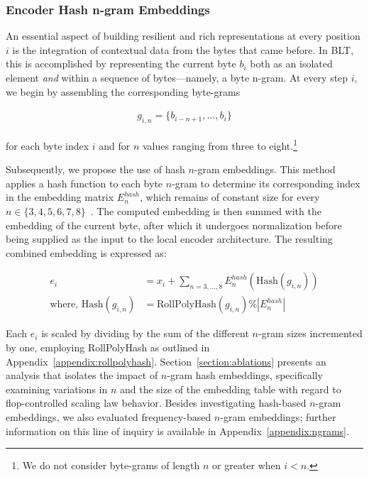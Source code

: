 \subsubsection{Encoder Hash n-gram Embeddings}
\label{sec:ngram-emb}
\label{sec:hash-emb}
An essential aspect of building resilient and rich representations at every position $i$ is the integration of contextual data from the bytes that came before. In {\textsc BLT}, this is accomplished by representing the current byte $b_i$ both as an isolated element \textit{and} within a sequence of bytes—namely, a byte n-gram. At every step $i$, we begin by assembling the corresponding byte-grams

\begin{align}
    g_{i,n}=\{b_{i-n + 1},\ldots, b_i\}
\end{align}

for each byte index $i$ and for $n$ values ranging from three to eight.\footnote{
We do not consider byte-grams of length $n$ or greater when $i<n$. }

Subsequently, we propose the use of hash $n$-gram embeddings. This method applies a hash function to each byte $n$-gram to determine its corresponding index in the embedding matrix $E_{n}^{hash}$, which remains of constant size for every $n \in\{3,4,5,6,7,8\}$~\citep{bai2010learning}. The computed embedding is then summed with the embedding of the current byte, after which it undergoes normalization before being supplied as the input to the local encoder architecture. The resulting combined embedding is expressed as:

\begin{align}
e_i &= x_i + \sum_{n = 3,...,8}E_{n}^{hash}(\text{Hash}(g_{i,n})) \\
\text{where, Hash}(g_{i,n}) &= \text{RollPolyHash}(g_{i,n}) \% |E_{n}^{hash}|
\end{align}

Each $e_i$ is scaled by dividing by the sum of the different $n$-gram sizes incremented by one, employing RollPolyHash as outlined in Appendix~\ref{appendix:rollpolyhash}. Section~\ref{section:ablations} presents an analysis that isolates the impact of $n$-gram hash embeddings, specifically examining variations in $n$ and the size of the embedding table with regard to flop-controlled scaling law behavior. Besides investigating hash-based $n$-gram embeddings, we also evaluated frequency-based $n$-gram embeddings; further information on this line of inquiry is available in Appendix~\ref{appendix:ngrams}.

